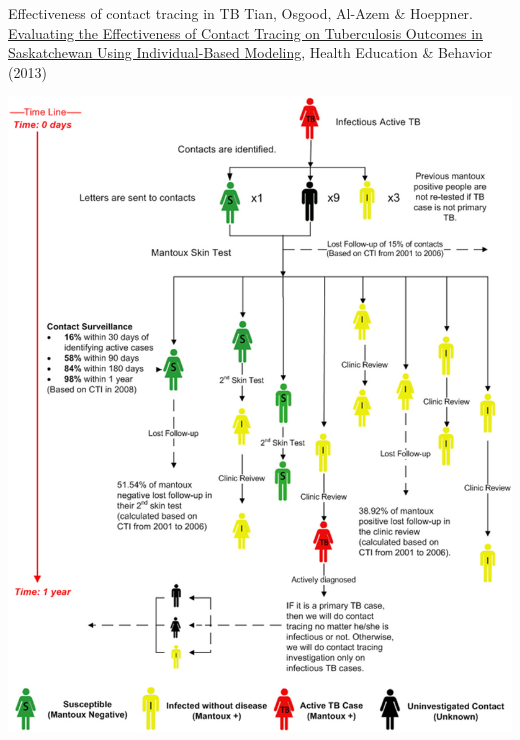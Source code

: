 \documentclass[aspectratio=43]{beamer}
\begin{document}
\begin{frame}{Effectiveness of contact tracing in TB}
Tian, Osgood, Al-Azem \& Hoeppner. \href{https://doi-org.uml.idm.oclc.org/10.1177\%2F1090198113493910}{Evaluating the Effectiveness of Contact Tracing on Tuberculosis Outcomes in Saskatchewan Using Individual-Based Modeling}, Health Education \& Behavior (2013)
\end{frame}


\begin{frame}
\begin{center}
\includegraphics[width=\textwidth]{FIGS/TianOsgood_etal_TB_CT.jpeg}
\end{center}
\end{frame}
\end{document}

